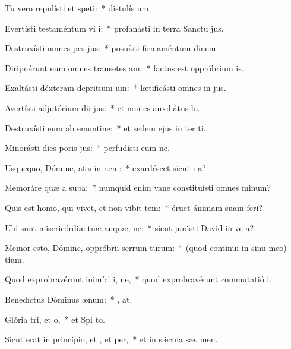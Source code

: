 \item Tu vero repulísti et speti:~* distulís  um.
\item Evertísti testaméntum vi i:~* profanásti in terra Sanctu jus.
\item Destruxísti omnes pes jus:~* posuísti firmaméntum  dinem.
\item Diripuérunt eum omnes transetes am:~* factus est oppróbrium  is.
\item Exaltásti déxteram depritium um:~* lætificásti omnes in jus.
\item Avertísti adjutórium dii jus:~* et non es auxiliátus   lo.
\item Destruxísti eum ab emuntine:~* et sedem ejus in ter ti.
\item Minorásti dies poris jus:~* perfudísti eum ne.
\item Usquequo, Dómine, atis in nem:~* exardéscet sicut i  a?
\item Memoráre quæ a suba:~* numquid enim vane constituísti omnes  minum?
\item Quis est homo, qui vivet, et non vibit tem:~* éruet ánimam suam   feri?
\item Ubi sunt misericórdiæ tuæ anquæ, ne:~* sicut jurásti David in ve a?
\item Memor esto, Dómine, oppróbrii serrum turum:~* (quod contínui in sinu meo)  tium.
\item Quod exprobravérunt inimíci i, ne,~* quod exprobravérunt commutatió  i.
\item Benedíctus Dóminus  ænum:~* , at.
\item Glória tri, et o,~* et Spi to.
\item Sicut erat in princípio, et , et per,~* et in sǽcula sæ. men.

